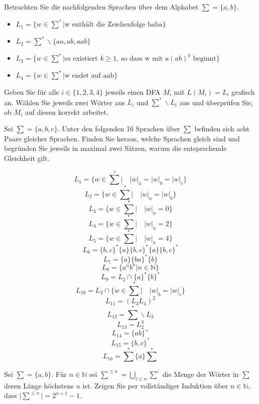 \documentclass[10pt, a4paper]{exam}
\begin{document}
\begin{questions}
    \question Betrachten Sie die nachfolgenden Sprachen über dem Alphabet $\sum = \{a, b\}$.
    \begin{itemize}
        \item $L_1 = \{w \in\sum^* \vert \text{w enthält die Zeichenfolge baba}\}$
        \item $L_2 = \sum^* \backslash \{aa, ab, aab\}$
        \item $L_3 = \{w \in\sum^* \vert \text{es existiert } k \geq 1 \text{, so dass w mit } a(ab)^k \text{ beginnt}\}$
        \item $L_4 = \{w\in\sum^* \vert \text{w endet auf aab}\}$
    \end{itemize}
    Geben Sie für alle $i\in\{1, 2, 3, 4\}$ jeweils einen DFA $M_i$ mit $L(M_i)=L_i$ grafisch an. Wählen Sie jeweils zwei Wörter aus $L_i$ und $\sum^*\backslash L_i$ aus und überprüfen Sie, ob $M_i$ auf diesen korrekt arbeitet.
    \begin{solution}
    \end{solution}

    \question Sei $\sum = \{a, b, c\}$. Unter den folgenden 16 Sprachen über $\sum$ befinden sich acht Paare gleicher Sprachen. Finden Sie heraus, welche Sprachen gleich sind und begründen Sie jeweils in maximal zwei Sätzen, warum die entsprechende Gleichheit gilt.
    \begin{multicols}{2}
        $$L_1 = \{w \in \sum^* \vert \quad\vert w\vert_a = \vert w\vert_b = \vert w\vert_c \}$$
        $$L_2 = \{w \in \sum^* \vert \quad\vert w\vert_a = \vert w\vert_b \}$$
        $$L_3 = \{w \in \sum^* \vert \quad\vert w\vert_a = 0\}$$
        $$L_4 = \{w \in \sum^* \vert \quad\vert w\vert_a = 2\}$$
        $$L_5 = \{w \in \sum^* \vert \quad\vert w\vert_a = 4\}$$
        $$L_6 = \{b, c\}^*\{a\}\{b, c\}^* \{a\}\{b, c\}^*$$
        $$L_7 = \{a\}\{ba\}^*\{b\}$$
        $$L_8 = \{a^n b^n \vert n \in \mathbb{N}\}$$
        $$L_9 = L_2 \cap \{a\}^*\{b\}^*$$
        $$L_{10} = L_2 \cap \{w \in \sum^* \vert \quad\vert w \vert_b = \vert w\vert_c\}$$
        $$L_{11} = (L_3 L_4 )^2$$
        $$L_{12} = \sum^* \backslash L_3$$
        $$L_{13} = L_2^3$$
        $$L_{14} = \{ab\}^+$$
        $$L_{15} = \{b, c\}^*$$
        $$L_{16} = \sum^* \{a\}\sum^*$$
    \end{multicols}
    \begin{solution}
    \end{solution}

    \question Sei $\sum=\{a, b\}$. Für $n\in\mathbb{N}$ sei $\sum^{\leq n} = \bigcup_{i\leq n} \sum^i$ die Menge der Wörter in $\sum$ deren Länge höchstens $n$ ist. Zeigen Sie per vollständiger Induktion über $n\in\mathbb{N}$, dass $\vert\sum^{\leq n}\vert = 2^{n+1} - 1$.
    \begin{solution}
    \end{solution}


\end{questions}
\end{document}
